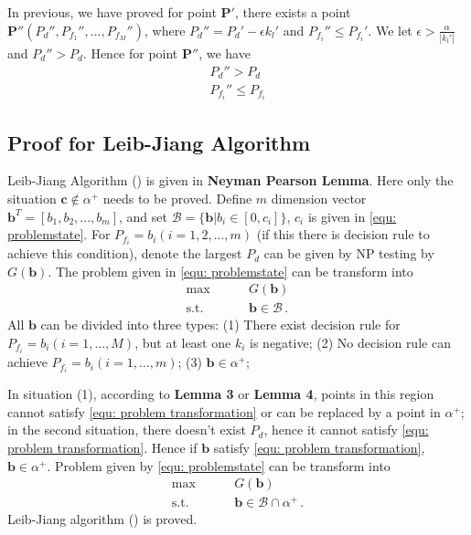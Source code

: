 \documentclass[12pt,journal,a4paper,twoside,onecolumn]{IEEEtran}
\newcommand{\rmnum}[1]{\romannumeral #1}
\begin{document}
\begin{spacing}{2.5}
In previous, we have proved for point $\mathbf{P}'$, there exists a point $\mathbf{P}'' (P_d'', P_{f_1}'', ..., P_{f_M}'')$, where $P_d'' = P_d' - \epsilon k_l'$ and $P_{f_i}'' \leq P_{f_i}'$. We let $\epsilon > \frac{\alpha}{|k_l'|}$ and $P_d'' > P_d$. Hence for point $\mathbf{P}''$, we have 
\begin{equation}
\begin{split}
P_d'' > P_d\\
P_{f_i}'' \leq P_{f_i}
\end{split}
\end{equation}


\subsection{Proof for Leib-Jiang Algorithm }
Leib-Jiang Algorithm (\rmnum{1}) is given in \textbf{Neyman Pearson Lemma}. Here only the situation  $\mathbf{c} \notin \alpha^+$ needs to be proved.
Define $m$ dimension vector $\mathbf{b}^T = [b_1, b_2, ..., b_m]$, and set $\mathcal{B} = \{ \mathbf{b} |  b_i \in [0, c_i] \}$, $c_i$
is given in \eqref{equ: problemstate}. For $P_{f_i} = b_i (i = 1, 2, ..., m)$ (if this there is decision rule to achieve this condition), denote the largest $P_d$ can be given by NP testing by $G(\mathbf{b})$. The problem given in \eqref{equ: problemstate} can be transform into
\begin{equation}
\label{equ: problem transformation}
\begin{split}
\max\;\;\;\;\;\;\;\;&G(\mathbf{b})\\
\text{s.t.}\;\;\;\;\;\;\;\;& \mathbf{b} \in \mathcal{B}\,.
\end{split}
\end{equation}
All $\mathbf{b}$ can be divided into three types: (1) There exist decision rule for $P_{f_i} = b_i (i = 1, ..., M)$, but at least one $k_i$ is negative; (2) No decision rule can achieve $P_{f_i} = b_i (i = 1, ..., m)$; (3) $\mathbf{b} \in \alpha^+$;

In situation (1), according to \textbf{Lemma 3} or \textbf{Lemma 4},  points in this region cannot satisfy \eqref{equ: problem transformation} or can be replaced by a point in $\alpha^+$; in the second situation, there doesn't exist $P_d$, hence it cannot satisfy \eqref{equ: problem transformation}. Hence if $\mathbf{b}$ satisfy \eqref{equ: problem transformation}, $\mathbf{b} \in \alpha^+$.  Problem given by \eqref{equ: problemstate} can be transform into
\begin{equation}
\label{equ: problem transformation 2}
\begin{split}
\max\;\;\;\;\;\;\;\;&G(\mathbf{b})\\
\text{s.t.}\;\;\;\;\;\;\;\;& \mathbf{b} \in \mathcal{B} \cap \alpha^+ \,.
\end{split}
\end{equation}
Leib-Jiang algorithm (\rmnum{2}) is proved.


\end{spacing}
\end{document}
